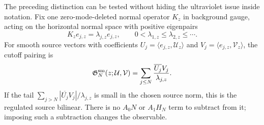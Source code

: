 \begin{controlledapproximation}
\label{ca:instanton-spectral-local-green-matching-test}
The preceding distinction can be tested without hiding the ultraviolet issue
inside notation.  Fix one zero-mode-deleted normal operator \(K_z\) in
background gauge, acting on the horizontal normal space with positive
eigenpairs
\[
  K_ze_{j,z}=\lambda_{j,z}e_{j,z},
  \qquad
  0<\lambda_{1,z}\le\lambda_{2,z}\le\cdots .
\]
For smooth source vectors with coefficients
\(U_j=\langle e_{j,z},\mathcal U_z\rangle\) and
\(V_j=\langle e_{j,z},\mathcal V_z\rangle\), the cutoff pairing is
\begin{equation}
  \mathfrak G_{N}^{\rm sm}(z;\mathcal U,\mathcal V)
  =
  \sum_{j\le N}\frac{\overline{U_j}V_j}{\lambda_{j,z}} .
  \label{eq:instanton-spectral-smooth-green-pairing}
\end{equation}
If the tail
\(\sum_{j>N}|\overline{U_j}V_j|/\lambda_{j,z}\) is small in the chosen source
norm, this is the regulated source bilinear.  There is no \(A_0N\) or
\(A_1H_N\) term to subtract from it; imposing such a subtraction changes the
observable.


\end{controlledapproximation}
